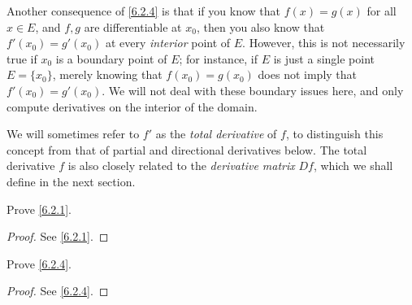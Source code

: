 \begin{note}
  Another consequence of \cref{6.2.4} is that if you know that \(f(x) = g(x)\) for all \(x \in E\), and \(f, g\) are differentiable at \(x_0\), then you also know that \(f'(x_0) = g'(x_0)\) at every \emph{interior} point of \(E\).
  However, this is not necessarily true if \(x_0\) is a boundary point of \(E\);
  for instance, if \(E\) is just a single point \(E = \{x_0\}\), merely knowing that \(f(x_0) = g(x_0)\) does not imply that \(f'(x_0) = g'(x_0)\).
  We will not deal with these boundary issues here, and only compute derivatives on the interior of the domain.
\end{note}

\begin{note}
  We will sometimes refer to \(f'\) as the \emph{total derivative} of \(f\), to distinguish this concept from that of partial and directional derivatives below.
  The total derivative \(f\) is also closely related to the \emph{derivative matrix} \(Df\),
  which we shall define in the next section.
\end{note}

\exercisesection

\begin{ex}\label{ex:6.2.1}
  Prove \cref{6.2.1}.
\end{ex}

\begin{proof}
  See \cref{6.2.1}.
\end{proof}

\begin{ex}\label{ex:6.2.2}
  Prove \cref{6.2.4}.
\end{ex}

\begin{proof}
  See \cref{6.2.4}.
\end{proof}